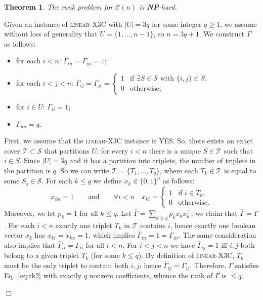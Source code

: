 \documentclass[envcountsect,envcountsame]{svjour3}
\theoremstyle{changebreak}                %
\newtheorem{theorem}[result]{Theorem}
\newenvironment{proof}
 {{\sl Proof.}\hspace*{1 ex}}%
 {{\nopagebreak\hspace*{\fill}$\Box$\par\vspace{12pt}}}
\newcommand{\transpose}[1]{{#1}^{\top}}
\newcommand{\CONX}[1]{\mathcal{C}(#1)}
\begin{document}
\begin{theorem}
  The rank problem for $\CONX{n}$ is \textbf{NP}-hard.
  \label{thm:rkhard}
\end{theorem}
\begin{proof}
  Given an instance of \textsc{linear}-X3C with $|U|=3q$ for some integer $q\ge 1$, we assume without loss of generality that $U=\{1,\ldots,n-1\}$, so $n=3q+1$. We construct $\Gamma$ as follows:
  \begin{itemize}
  \item for each $i<n$: $\Gamma_{in}=\Gamma_{ni} = 1$;
  \item for each $i<j<n$:
    $\Gamma_{ij} = \Gamma_{ji} = \left\{\begin{array}{ll} 1 & \mbox{if $\exists S\in\mathcal{S}$ with $\{i,j\}\in S$,} \\
      0 & \mbox{otherwise;}
    \end{array}\right.
    $
  \item for $i\in U$: $\Gamma_{ii} = 1$;
  \item $\Gamma_{nn}=q$.
  \end{itemize}
  
  First, we assume that the \textsc{linear}-X3C instance is YES. So, there exists an exact cover $\mathcal{T}\subset\mathcal{S}$ that partitions $U$: for every $i<n$ there is a unique $S\in\mathcal{T}$ such that $i\in S$. Since $|U|=3q$ and it has a partition into triplets, the number of triplets in the partition is $q$. So we can write $\mathcal{T}=\{T_1,\ldots,T_q\}$, where each $T_k\in\mathcal{T}$ is equal to some $S_j\in\mathcal{S}$. For each $k\le q$ we define $x_k\in\{0,1\}^n$ as follows:
  \[
  x_{kn}=1 \qquad \mbox{and} \qquad \forall i<n\quad x_{ki}=\left\{\begin{array}{ll} 1 & \mbox{if $i\in T_k$,} \\ 0 & \mbox{otherwise.}\end{array}\right.
  \]
  Moreover, we let $p_k=1$ for all $k\le q$. Let $\bar{\Gamma}=\sum_{k\le q} p_k x_k\transpose{x}_k$: we claim that $\bar{\Gamma}=\Gamma$. For each $i<n$ exactly one triplet $T_k$ in $\mathcal{T}$ contains $i$, hence exactly one boolean vector $x_k$ has $x_{ki}=x_{kn}=1$, which implies $\bar{\Gamma}_{in}=1=\Gamma_{in}$. The same consideration also implies that $\bar{\Gamma}_{ii}=\Gamma_{ii}$ for all $i<n$. For $i<j<n$ we have $\bar{\Gamma}_{ij}=1$ iff $i,j$ both belong to a given triplet $T_k$ (for some $k\le q$). By definition of \textsc{linear}-X3C, $T_k$ must be the only triplet to contain both $i,j$: hence $\bar{\Gamma}_{ij}=\Gamma_{ij}$. Therefore, $\Gamma$ satisfies Eq.~\eqref{eq:rk2} with exactly $q$ nonzero coefficients, whence the rank of $\Gamma$ is $\le q$.


\end{proof}
\end{document}
